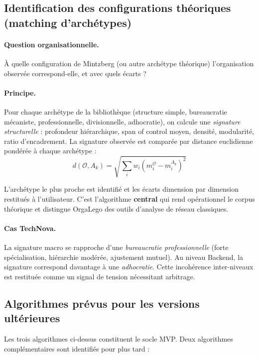 \documentclass[11pt,a4paper]{article}
\begin{document}
\subsection{Identification des configurations théoriques (matching d'archétypes)}

\paragraph{Question organisationnelle.} À quelle configuration de Mintzberg (ou autre archétype théorique) l'organisation observée correspond-elle, et avec quels écarts ?

\paragraph{Principe.} Pour chaque archétype de la bibliothèque (structure simple, bureaucratie mécaniste, professionnelle, divisionnelle, adhocratie), on calcule une \emph{signature structurelle} : profondeur hiérarchique, span of control moyen, densité, modularité, ratio d'encadrement. La signature observée est comparée par distance euclidienne pondérée à chaque archétype :
\[
d(\mathcal{O}, A_k) = \sqrt{\sum_i w_i (m_i^{\mathcal{O}} - m_i^{A_k})^2}
\]

L'archétype le plus proche est identifié et les écarts dimension par dimension restitués à l'utilisateur. C'est l'algorithme \textbf{central} qui rend opérationnel le corpus théorique et distingue OrgaLego des outils d'analyse de réseau classiques.

\paragraph{Cas TechNova.} La signature macro se rapproche d'une \emph{bureaucratie professionnelle} (forte spécialisation, hiérarchie modérée, ajustement mutuel). Au niveau Backend, la signature correspond davantage à une \emph{adhocratie}. Cette incohérence inter-niveaux est restituée comme un signal de tension nécessitant arbitrage.

\subsection{Algorithmes prévus pour les versions ultérieures}

Les trois algorithmes ci-dessus constituent le socle MVP. Deux algorithmes complémentaires sont identifiés pour plus tard :
\end{document}
